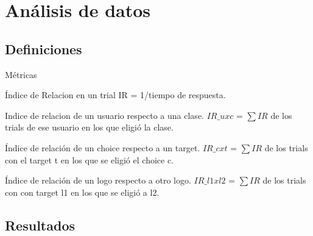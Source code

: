 \documentclass{beamer}
\begin{document}
\section{Análisis de datos}

\subsection{Definiciones}

\begin{frame}{Métricas}
\begin{block}{Índice de Relacion en un trial}
IR = 1/tiempo de respuesta. 
\end{block}

\begin{block}{Indice de relacion de un usuario respecto a una clase.}
$IR\_uxc$ = $\sum IR$ de los trials de ese usuario en los que eligió la clase.
\end{block}

\begin{block}{Índice de relación de un choice respecto a un target.}
$IR\_cxt$ = $\sum IR$ de los trials con el target t en los que se eligió el choice c.
\end{block}

\begin{block}{Índice de relación de un logo respecto a otro logo.}
$IR\_l1xl2$ = $\sum IR$ de los trials con con target l1 en los que se eligió a l2.
\end{block}

\end{frame}

\subsection{Resultados}
\end{document}
